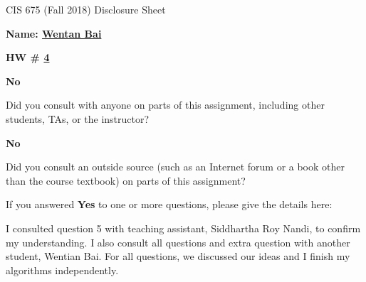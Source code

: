 \documentclass[12pt]{article}
\newcommand*\circled[1]{\tikz[baseline=(char.base)]{
            \node[shape=circle,draw,inner sep=2pt] (char) {#1};}}
\begin{document}
\begin{center}
  \Large
  CIS 675 (Fall 2018) Disclosure Sheet 
\end{center} 
\vspace*{2em}

\noindent
\textbf{\Large Name: \underline{ Wentan Bai }} 


\noindent 
\begin{minipage}[t]{1.0\linewidth}

\begin{minipage}[t]{0.25\linewidth}
\textbf{\Large
  HW \# \underline{ 4 }
} 

\end{minipage} \vspace*{3ex}




\begin{minipage}[t]{.8in}
  \textbf{\circled{Yes} \quad No}
\end{minipage}
\qquad 
\begin{minipage}[t]{5.5in}
  Did you consult with anyone on parts of this assignment, including other students, TAs, or the instructor? 
\end{minipage}
\vspace*{1ex}

\begin{minipage}[t]{.8in}
  \textbf{\circled{Yes} \quad No}
\end{minipage}
\qquad 
\begin{minipage}[t]{5.5in}
  Did you consult an outside source (such as an Internet forum or a
  book other than the course textbook) on parts of this assignment? 
\end{minipage}
\vspace*{1ex}

\noindent
  If you answered \textbf{Yes} to one or more questions, please give the details here: \vspace*{5ex} \par
  I consulted question 5 with teaching assistant, Siddhartha Roy Nandi, to confirm my understanding. 
  I also consult all questions and extra question with another student, Wentian Bai. For all questions, we discussed our ideas and I finish my algorithms independently. 

 

\vfill
\end{minipage}



\vspace*{40ex}
\end{document}
